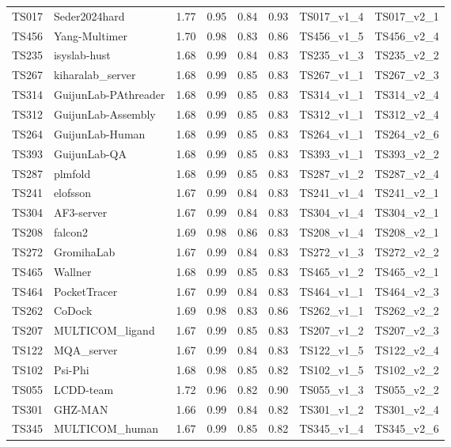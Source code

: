 \begin{longtable}{llllllll}
TS017 & Seder2024hard & 1.77 & 0.95 & 0.84 & 0.93 & TS017\_v1\_4 & TS017\_v2\_1 \\ 
TS456 & Yang-Multimer & 1.70 & 0.98 & 0.83 & 0.86 & TS456\_v1\_5 & TS456\_v2\_4 \\ 
TS235 & isyslab-hust & 1.68 & 0.99 & 0.84 & 0.83 & TS235\_v1\_3 & TS235\_v2\_2 \\ 
TS267 & kiharalab\_server & 1.68 & 0.99 & 0.85 & 0.83 & TS267\_v1\_1 & TS267\_v2\_3 \\ 
TS314 & GuijunLab-PAthreader & 1.68 & 0.99 & 0.85 & 0.83 & TS314\_v1\_1 & TS314\_v2\_4 \\ 
TS312 & GuijunLab-Assembly & 1.68 & 0.99 & 0.85 & 0.83 & TS312\_v1\_1 & TS312\_v2\_4 \\ 
TS264 & GuijunLab-Human & 1.68 & 0.99 & 0.85 & 0.83 & TS264\_v1\_1 & TS264\_v2\_6 \\ 
TS393 & GuijunLab-QA & 1.68 & 0.99 & 0.85 & 0.83 & TS393\_v1\_1 & TS393\_v2\_2 \\ 
TS287 & plmfold & 1.68 & 0.99 & 0.85 & 0.83 & TS287\_v1\_2 & TS287\_v2\_4 \\ 
TS241 & elofsson & 1.67 & 0.99 & 0.84 & 0.83 & TS241\_v1\_4 & TS241\_v2\_1 \\ 
TS304 & AF3-server & 1.67 & 0.99 & 0.84 & 0.83 & TS304\_v1\_4 & TS304\_v2\_1 \\ 
TS208 & falcon2 & 1.69 & 0.98 & 0.86 & 0.83 & TS208\_v1\_4 & TS208\_v2\_1 \\ 
TS272 & GromihaLab & 1.67 & 0.99 & 0.84 & 0.83 & TS272\_v1\_3 & TS272\_v2\_2 \\ 
TS465 & Wallner & 1.68 & 0.99 & 0.85 & 0.83 & TS465\_v1\_2 & TS465\_v2\_1 \\ 
TS464 & PocketTracer & 1.67 & 0.99 & 0.84 & 0.83 & TS464\_v1\_1 & TS464\_v2\_3 \\ 
TS262 & CoDock & 1.69 & 0.98 & 0.83 & 0.86 & TS262\_v1\_1 & TS262\_v2\_2 \\ 
TS207 & MULTICOM\_ligand & 1.67 & 0.99 & 0.85 & 0.83 & TS207\_v1\_2 & TS207\_v2\_3 \\ 
TS122 & MQA\_server & 1.67 & 0.99 & 0.84 & 0.83 & TS122\_v1\_5 & TS122\_v2\_4 \\ 
TS102 & Psi-Phi & 1.68 & 0.98 & 0.85 & 0.82 & TS102\_v1\_5 & TS102\_v2\_2 \\ 
TS055 & LCDD-team & 1.72 & 0.96 & 0.82 & 0.90 & TS055\_v1\_3 & TS055\_v2\_2 \\ 
TS301 & GHZ-MAN & 1.66 & 0.99 & 0.84 & 0.82 & TS301\_v1\_2 & TS301\_v2\_4 \\ 
TS345 & MULTICOM\_human & 1.67 & 0.99 & 0.85 & 0.82 & TS345\_v1\_4 & TS345\_v2\_6 \\ 

\end{longtable}
